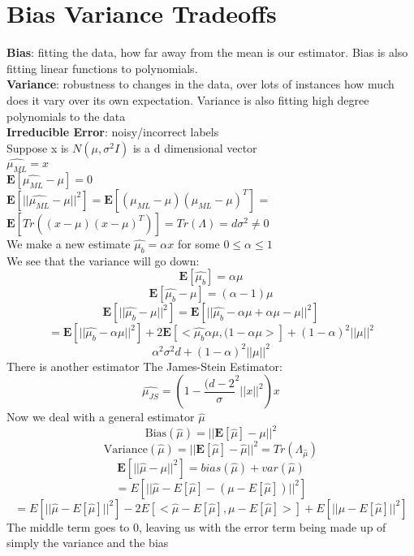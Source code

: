\documentclass{article}
\begin{document}
\section{Bias Variance Tradeoffs}
\textbf{Bias}: fitting the data, how far away from the mean is our estimator. Bias is also fitting linear functions to polynomials.\\
\textbf{Variance}: robustness to changes in the data, over lots of instances how much does it vary over its own expectation. Variance is also fitting high degree polynomials to the data\\
\textbf{Irreducible Error}: noisy/incorrect labels\\ 
Suppose x is $N(\mu, \sigma^2 I)$ is a d dimensional vector \\
$\hat{\mu_{ML}} = x$ \\
$\mathbf{E}[\hat{\mu_{ML}} - \mu] = 0$ \\
$\mathbf{E}[||\hat{\mu_{ML}} - \mu||^2] = \mathbf{E}[(\mu_{ML}-\mu)(\mu_{ML}-\mu)^T]$ = $\mathbf{E}[Tr((x-\mu)(x-\mu)^T)] = Tr(\Lambda) = d\sigma^2 \neq 0$ \\
We make a new estimate $\hat{\mu_b} = \alpha x$ for some $0 \leq \alpha \leq 1$ \\
We see that the variance will go down:
$$\mathbf{E}[\hat{\mu_b}] = \alpha \mu$$
$$\mathbf{E}[\hat{\mu_b} - \mu] = (\alpha - 1) \mu $$
$$\mathbf{E}[||\hat{\mu_b} - \mu||^2] = \mathbf{E}[||\hat{\mu_b} - \alpha \mu + \alpha \mu - \mu||^2]$$
$$= \mathbf{E}[||\hat{\mu_b} - \alpha \mu ||^2] + 2 \mathbf{E}[<\hat{\mu_b}  \alpha \mu, (1-\alpha \mu>] + (1-\alpha)^2 ||\mu||^2$$
$$\alpha^2 \sigma^2 d + (1-\alpha)^2 ||\mu||^2$$
There is another estimator The James-Stein Estimator:
$$\hat{\mu_{JS}} = (1 - \frac{(d-2}\sigma^2{||x||^2})x$$
Now we deal with a general estimator $\hat{\mu}$
$$\textrm{Bias}(\hat{\mu}) = ||\mathbf{E}[\hat{\mu}] - \mu||^2$$
$$\textrm{Variance}(\hat{\mu}) = ||\mathbf{E}[\hat{\mu}] - \hat{\mu}||^2 = Tr(\Lambda_{\hat{\mu}})$$
$$\mathbf{E}[||\hat{\mu} - \mu||^2] = bias(\hat{\mu}) + var(\hat{\mu})$$
$$= E[||\hat{\mu} - E[\hat{\mu}] - (\mu - E[\hat{\mu}])||^2]$$
$$= E[||\hat{\mu} - E[\hat{\mu}]||^2] - 2 E[<\hat{\mu} - E[\hat{\mu}],\mu - E[\hat{\mu}]>] + E[|| \mu - E[\hat{\mu}]||^2]$$
The middle term goes to 0, leaving us with the error term being made up of simply the variance and the bias
\end{document}
